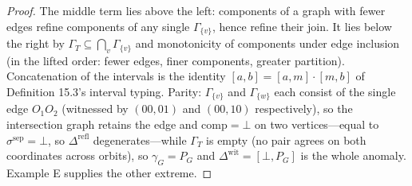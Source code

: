 \begin{proof}

The middle term lies above the left: components of a graph with fewer edges refine components of any single \(\Gamma_{\{v\}}\), hence refine their join. It lies below the right by \(\Gamma_T \subseteq \bigcap_v \Gamma_{\{v\}}\) and monotonicity of components under edge inclusion (in the lifted order: fewer edges, finer components, greater partition). Concatenation of the intervals is the identity \([a, b] = [a, m] \cdot [m, b]\) of Definition 15.3's interval typing. Parity: \(\Gamma_{\{v\}}\) and \(\Gamma_{\{w\}}\) each consist of the single edge \(O_1O_2\) (witnessed by \((00, 01)\) and \((00, 10)\) respectively), so the intersection graph retains the edge and \(\mathrm{comp} = \bot\) on two vertices---\hspace{0pt}equal to \(\sigma^{\mathrm{sep}} = \bot\), so \(\Delta^{\mathrm{refl}}\) degenerates---\hspace{0pt}while \(\Gamma_T\) is empty (no pair agrees on both coordinates across orbits), so \(\gamma_G = P_G\) and \(\Delta^{\mathrm{wit}} = [\bot, P_G]\) is the whole anomaly. Example E supplies the other extreme.
\end{proof}

